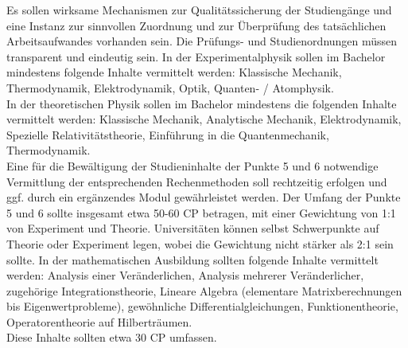         Es sollen wirksame Mechanismen zur Qualitätssicherung der Studiengänge und eine Instanz zur sinnvollen Zuordnung und zur Überprüfung des tatsächlichen Arbeitsaufwandes vorhanden sein.
        Die Prüfungs- und Studienordnungen müssen transparent und eindeutig sein.
        In der Experimentalphysik sollen im Bachelor mindestens folgende Inhalte vermittelt werden:
            Klassische Mechanik,
            Thermodynamik,
            Elektrodynamik,
            Optik,
            Quanten- / Atomphysik.\\
        In der theoretischen Physik sollen im Bachelor mindestens die folgenden Inhalte vermittelt werden:
            Klassische Mechanik,
            Analytische Mechanik,
            Elektrodynamik,
            Spezielle Relativitätstheorie,
            Einführung in die Quantenmechanik,
            Thermodynamik.\\
        Eine für die Bewältigung der Studieninhalte der Punkte 5 und 6 notwendige Vermittlung der entsprechenden Rechenmethoden soll rechtzeitig erfolgen und ggf. durch ein ergänzendes Modul gewährleistet werden.
        Der Umfang der Punkte 5 und 6 sollte insgesamt etwa 50-60 CP betragen, mit einer Gewichtung von 1:1 von Experiment und Theorie. Universitäten können selbst Schwerpunkte auf Theorie oder Experiment legen, wobei die Gewichtung nicht stärker als 2:1 sein sollte.
        In der mathematischen Ausbildung sollten folgende Inhalte vermittelt werden:
            Analysis einer Veränderlichen,
            Analysis mehrerer Veränderlicher,
            zugehörige Integrationstheorie,
            Lineare Algebra (elementare Matrixberechnungen bis Eigenwertprobleme),
            gewöhnliche Differentialgleichungen,
            Funktionentheorie,
            Operatorentheorie auf Hilberträumen.\\

            Diese Inhalte sollten etwa 30 CP umfassen.\\

